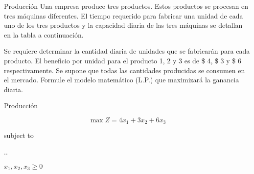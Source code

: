




\begin{frameExample}{Producción}{}
  Una empresa produce tres productos. Estos productos se procesan en tres máquinas diferentes. El tiempo requerido para fabricar una unidad de cada uno de los tres productos y la capacidad diaria de las tres máquinas se detallan en la tabla a continuación.

  {\centering
    \par}
  
  

   Se requiere determinar la cantidad diaria de unidades que se fabricarán para cada producto. El beneficio por unidad para el producto 1, 2 y 3 es de \$ 4, \$ 3 y \$ 6 respectivamente. Se supone que todas las cantidades producidas se consumen en el mercado. Formule el modelo matemático (L.P.) que maximizará la ganancia diaria.
\end{frameExample}

\begin{frameExample}{Producción}{}



  \[ \max Z = 4x_1 + 3x_2 + 6x_3\]
  
  {\centering
    subject to

    \sysdelim..

    \vspace{5mm}
    $    x_1, x_2,x_3  \geq 0$
    \par}

\end{frameExample}



